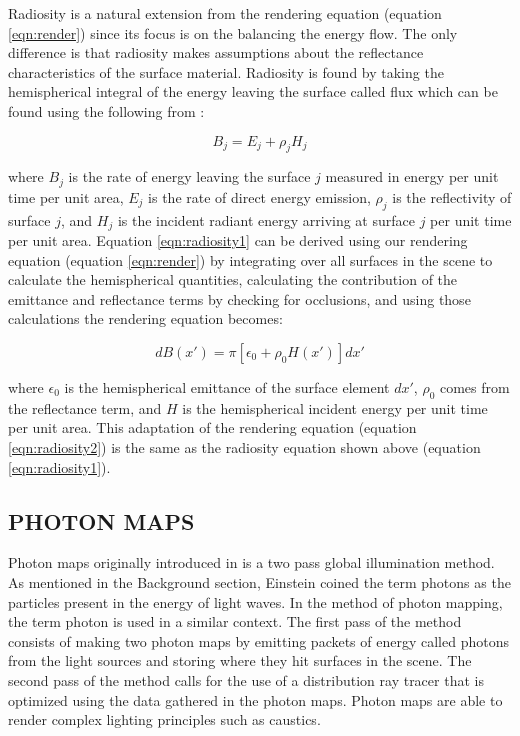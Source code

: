 Radiosity is a natural extension from the rendering equation (equation \ref{eqn:render}) since its focus is on the balancing the energy flow.  The only difference is that radiosity makes assumptions about the reflectance characteristics of the surface material.  Radiosity is found by taking the hemispherical integral of the energy leaving the surface called flux which can be found using the following from \cite{Goral1984}:

\begin{equation}
B_{j} = E_{j} + \rho_{j}H_{j} \label{eqn:radiosity1}
\end{equation}

where $B_{j}$ is the rate of energy leaving the surface $j$ measured in energy per unit time per unit area, $E_{j}$ is the rate of direct energy emission,  $ρ_{j}$ is the reflectivity of surface $j$, and $H_{j}$ is the incident radiant energy arriving at surface $j$ per unit time per unit area. Equation \ref{eqn:radiosity1} can be derived using our rendering equation (equation \ref{eqn:render}) \cite{Kajiya1986} by integrating over all surfaces in the scene to calculate the hemispherical quantities, calculating the contribution of the emittance and reflectance terms by checking for occlusions, and using those calculations the rendering equation becomes:

\begin{equation}
dB(x') = \pi[\epsilon_{0} + \rho_{0}H(x')]dx' \label{eqn:radiosity2}
\end{equation}

where $\epsilon_{0}$ is the hemispherical emittance of the surface element $dx'$, $\rho_{0}$ comes from the reflectance term, and $H$ is the hemispherical incident energy per unit time per unit area.  This adaptation of the rendering equation (equation \ref{eqn:radiosity2}) is the same as the radiosity equation shown above (equation \ref{eqn:radiosity1}).

\subsection{PHOTON MAPS}

Photon maps originally introduced in \cite{Jensen1996} is a two pass global illumination method.  As mentioned in the Background section, Einstein coined the term photons as the particles present in the energy of light waves.  In the method of photon mapping, the term photon is used in a similar context.  The first pass of the method consists of making two photon maps by emitting packets of energy called photons from the light sources and storing where they hit surfaces in the scene.  The second pass of the method calls for the use of a distribution ray tracer that is optimized using the data gathered in the photon maps.  Photon maps are able to render complex lighting principles such as caustics.

